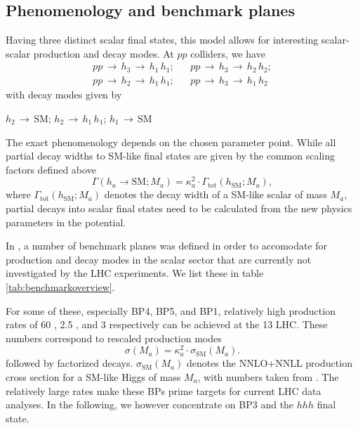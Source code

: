 \subsection{Phenomenology and benchmark planes}
Having three distinct scalar final states, this model allows for interesting scalar-scalar production and decay modes. At $pp$ colliders, we have
\begin{eqnarray*}
pp\,\rightarrow\,h_3\,\rightarrow\,h_1\,h_1;&& 
pp\,\rightarrow\,h_3\,\rightarrow\,h_2\,h_2;\\
pp\,\rightarrow\,h_2\,\rightarrow\,h_1\,h_1;&&
pp\,\rightarrow\,h_3\,\rightarrow\,h_1\,h_2
\end{eqnarray*}
with decay modes given by
\begin{center}
$h_2\,\rightarrow\,\text{SM}$; 
$h_2\,\rightarrow\,h_1\,h_1$; $h_1\,\rightarrow\,\text{SM}$
\end{center}
The exact phenomenology depends on the chosen parameter point. While all partial decay widths to SM-like final states are given by the common scaling factors defined above 
\begin{equation}
    \Gamma(h_a\to\text{SM}; M_a) = \kappa_a^2 \cdot \Gamma_\text{tot}(h_\text{SM}; M_a),\label{eq:widthscaling}
\end{equation}
{where $ \Gamma_\text{tot}(h_\text{SM}; M_a)$ denotes the decay width of a SM-like scalar of mass $M_a$,}
partial decays into scalar final states need to be calculated from the new physics parameters in the potential. 

In \cite{Robens:2019kga}, a number of benchmark planes was defined in order to accomodate for production and decay modes in the scalar sector that are currently not investigated by the LHC experiments. We list these in table \ref{tab:benchmarkoverview}.

For some of these, especially BP4, BP5, and BP1, relatively high production rates of 60 \pb, 2.5 \pb, and 3 \pb respectively can be achieved at the 13 \TeV LHC. These numbers correspond to rescaled production modes
 \begin{equation}\label{eqn:sigfac}
    \sigma(M_a) = \kappa_a^2 \cdot \sigma_\text{SM} ( M_a).
\end{equation}
followed by factorized decays. $\sigma_\text{SM} ( M_a)$ denotes the NNLO+NNLL production cross section for a SM-like Higgs of mass $M_a$, with numbers taken from \cite{Heinemeyer:2013tqa}. The relatively large rates make these BPs prime targets for current LHC data analyses. In the following, we however concentrate on BP3 and the $hhh$ final state.

